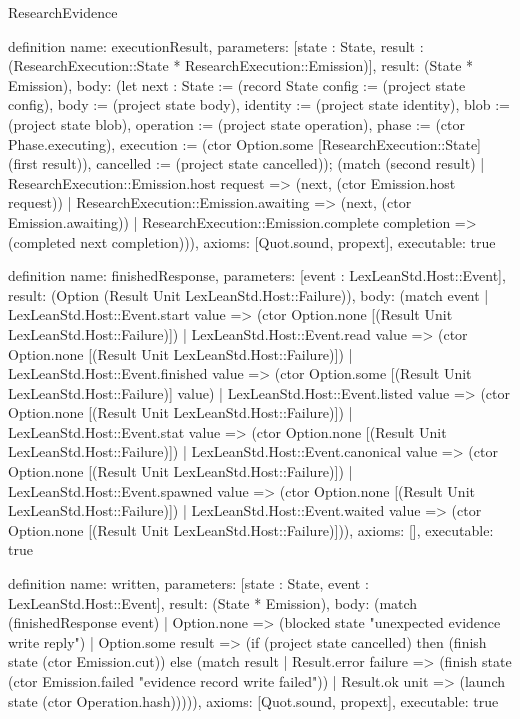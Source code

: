 \begin{lexlean}{ResearchEvidence}
\begin{semanticmodule}
definition{
 name: executionResult,
 parameters: [state : State, result : (ResearchExecution::State * ResearchExecution::Emission)],
 result: (State * Emission),
 body: (let next : State := (record State {config := (project state config), body := (project state body), identity := (project state identity), blob := (project state blob), operation := (project state operation), phase := (ctor Phase.executing), execution := (ctor Option.some [ResearchExecution::State] (first result)), cancelled := (project state cancelled)}); (match (second result) | ResearchExecution::Emission.host request => (next, (ctor Emission.host request)) | ResearchExecution::Emission.awaiting => (next, (ctor Emission.awaiting)) | ResearchExecution::Emission.complete completion => (completed next completion))),
 axioms: [Quot.sound, propext],
 executable: true
}

definition{
 name: finishedResponse,
 parameters: [event : LexLeanStd.Host::Event],
 result: (Option (Result Unit LexLeanStd.Host::Failure)),
 body: (match event | LexLeanStd.Host::Event.start value => (ctor Option.none [(Result Unit LexLeanStd.Host::Failure)]) | LexLeanStd.Host::Event.read value => (ctor Option.none [(Result Unit LexLeanStd.Host::Failure)]) | LexLeanStd.Host::Event.finished value => (ctor Option.some [(Result Unit LexLeanStd.Host::Failure)] value) | LexLeanStd.Host::Event.listed value => (ctor Option.none [(Result Unit LexLeanStd.Host::Failure)]) | LexLeanStd.Host::Event.stat value => (ctor Option.none [(Result Unit LexLeanStd.Host::Failure)]) | LexLeanStd.Host::Event.canonical value => (ctor Option.none [(Result Unit LexLeanStd.Host::Failure)]) | LexLeanStd.Host::Event.spawned value => (ctor Option.none [(Result Unit LexLeanStd.Host::Failure)]) | LexLeanStd.Host::Event.waited value => (ctor Option.none [(Result Unit LexLeanStd.Host::Failure)])),
 axioms: [],
 executable: true
}

definition{
 name: written,
 parameters: [state : State, event : LexLeanStd.Host::Event],
 result: (State * Emission),
 body: (match (finishedResponse event) | Option.none => (blocked state "unexpected evidence write reply") | Option.some result => (if (project state cancelled) then (finish state (ctor Emission.cut)) else (match result | Result.error failure => (finish state (ctor Emission.failed "evidence record write failed")) | Result.ok unit => (launch state (ctor Operation.hash))))),
 axioms: [Quot.sound, propext],
 executable: true
}


\end{semanticmodule}
\end{lexlean}
